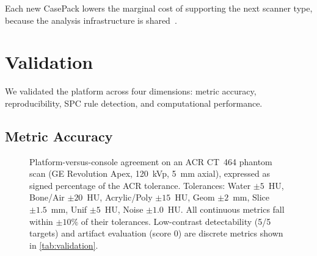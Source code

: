 \documentclass[11pt]{article}
\newcommand{\pwm}{\textsc{pwm}}
\begin{document}
Each new CasePack lowers the marginal cost of supporting the next
scanner type, because the analysis infrastructure is
shared~\cite{solveeverything}.


\section{Validation}
\label{sec:validation}

We validated the platform across four dimensions: metric accuracy,
reproducibility, SPC rule detection, and computational performance.

\subsection{Metric Accuracy}
\label{sec:val_accuracy}

\begin{figure}[t]
\centering
{}
\caption{%
  Platform-versus-console agreement on an ACR CT~464 phantom
  scan (GE Revolution Apex, 120~kVp, 5~mm axial), expressed as
  signed percentage of the ACR tolerance.
  Tolerances: Water $\pm 5$~HU, Bone/Air $\pm 20$~HU,
  Acrylic/Poly $\pm 15$~HU, Geom $\pm 2$~mm, Slice $\pm 1.5$~mm,
  Unif $\pm 5$~HU, Noise $\pm 1.0$~HU.
  All continuous metrics fall within $\pm 10\%$ of their tolerances.
  Low-contrast detectability (5/5 targets) and artifact evaluation
  (score 0) are discrete metrics shown in \cref{tab:validation}.
}
\label{fig:validation}
\end{figure}
\end{document}

